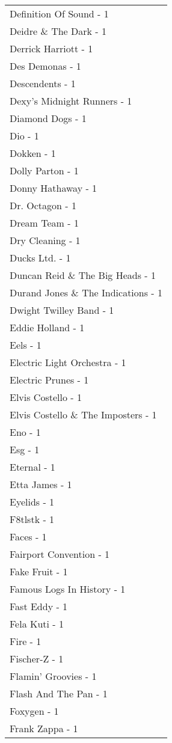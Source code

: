 \documentclass[
]{article}
\begin{document}
\begin{longtable}{l}
Definition Of Sound - 1 \\ 
Deidre \& The Dark - 1 \\ 
Derrick Harriott - 1 \\ 
Des Demonas - 1 \\ 
Descendents - 1 \\ 
Dexy's Midnight Runners - 1 \\ 
Diamond Dogs - 1 \\ 
Dio - 1 \\ 
Dokken - 1 \\ 
Dolly Parton - 1 \\ 
Donny Hathaway - 1 \\ 
Dr. Octagon - 1 \\ 
Dream Team - 1 \\ 
Dry Cleaning - 1 \\ 
Ducks Ltd. - 1 \\ 
Duncan Reid \& The Big Heads - 1 \\ 
Durand Jones \& The Indications - 1 \\ 
Dwight Twilley Band - 1 \\ 
Eddie Holland - 1 \\ 
Eels - 1 \\ 
Electric Light Orchestra - 1 \\ 
Electric Prunes - 1 \\ 
Elvis Costello - 1 \\ 
Elvis Costello \& The Imposters - 1 \\ 
Eno - 1 \\ 
Esg - 1 \\ 
Eternal - 1 \\ 
Etta James - 1 \\ 
Eyelids - 1 \\ 
F8tlstk - 1 \\ 
Faces - 1 \\ 
Fairport Convention - 1 \\ 
Fake Fruit - 1 \\ 
Famous Logs In History - 1 \\ 
Fast Eddy - 1 \\ 
Fela Kuti - 1 \\ 
Fire - 1 \\ 
Fischer-Z - 1 \\ 
Flamin' Groovies - 1 \\ 
Flash And The Pan - 1 \\ 
Foxygen - 1 \\ 
Frank Zappa - 1 \\ 

\end{longtable}
\end{document}
